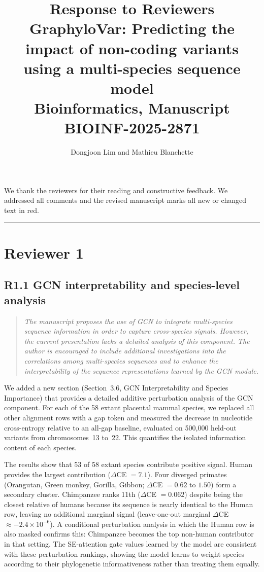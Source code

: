 \documentclass[11pt]{article}
\title{\textbf{Response to Reviewers}\\[0.5em]
  \large GraphyloVar: Predicting the impact of non-coding variants\\
  using a multi-species sequence model\\[0.5em]
  \normalsize Bioinformatics, Manuscript BIOINF-2025-2871}
\author{Dongjoon Lim and Mathieu Blanchette}
\date{}
\begin{document}
\maketitle

We thank the reviewers for their reading and constructive feedback.
We addressed all comments and the revised manuscript marks all new or
changed text in red.

\bigskip
\hrule
\section*{Reviewer 1}

\subsection*{R1.1 GCN interpretability and species-level analysis}

\begin{quote}
\itshape
The manuscript proposes the use of GCN to integrate multi-species
sequence information in order to capture cross-species signals.
However, the current presentation lacks a detailed analysis of this
component.  The author is encouraged to include additional
investigations into the correlations among multi-species sequences
and to enhance the interpretability of the sequence representations
learned by the GCN module.
\end{quote}

We added a new section (Section~3.6, GCN Interpretability and Species
Importance) that provides a detailed additive perturbation analysis of
the GCN component.  For each of the 58 extant placental mammal species,
we replaced all other alignment rows with a gap token and measured the
decrease in nucleotide cross-entropy relative to an all-gap baseline,
evaluated on 500,000 held-out variants from chromosomes~13 to~22.  This
quantifies the isolated information content of each species.

The results show that 53 of 58 extant species contribute positive signal.
Human provides the largest contribution ($\Delta$CE $= 7.1$).  Four
diverged primates (Orangutan, Green monkey, Gorilla, Gibbon;
$\Delta$CE $= 0.62$ to $1.50$) form a secondary cluster.  Chimpanzee
ranks 11th ($\Delta$CE $= 0.062$) despite being the closest relative of
humans because its sequence is nearly identical to the Human row, leaving
no additional marginal signal (leave-one-out marginal $\Delta$CE
$\approx -2.4 \times 10^{-6}$).  A conditional perturbation analysis in
which the Human row is also masked confirms this: Chimpanzee becomes the
top non-human contributor in that setting.  The SE-attention gate values
learned by the model are consistent with these perturbation rankings,
showing the model learns to weight species according to their
phylogenetic informativeness rather than treating them equally.
\end{document}
